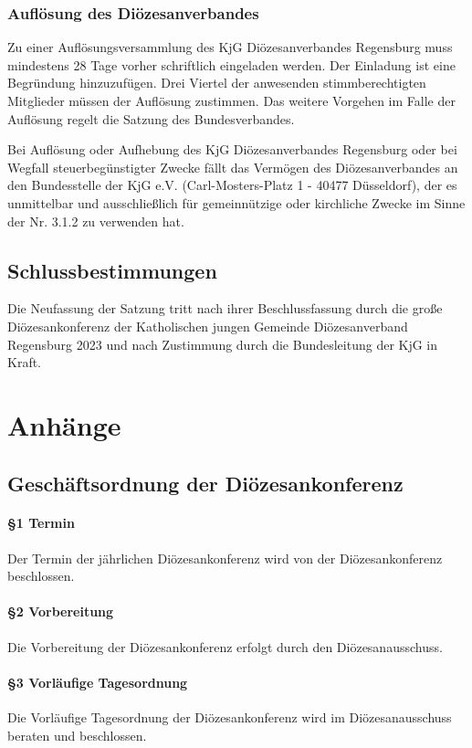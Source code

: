 \documentclass[12pt]{report}
\begin{document}
\begin{justify}
\section{Auflösung des Diözesanverbandes}
Zu einer Auflösungsversammlung des KjG Diözesanverbandes Regensburg muss mindestens 28 Tage vorher
schriftlich eingeladen werden. Der Einladung ist eine Begründung hinzuzufügen. Drei Viertel der
anwesenden stimmberechtigten Mitglieder müssen der Auflösung zustimmen. Das weitere Vorgehen
im Falle der Auflösung regelt die Satzung des Bundesverbandes.

Bei Auflösung oder Aufhebung des KjG Diözesanverbandes Regensburg oder bei Wegfall steuerbegünstigter Zwecke fällt das Vermögen des Diözesanverbandes an den Bundesstelle der KjG e.V. (Carl-Mosters-Platz 1 - 40477 Düsseldorf), der es unmittelbar und ausschließlich für gemeinnützige oder kirchliche Zwecke im Sinne der Nr. 3.1.2 zu verwenden hat.

\chapter{Schlussbestimmungen}
Die Neufassung der Satzung tritt nach ihrer Beschlussfassung durch die große
Diözesankonferenz der Katholischen jungen Gemeinde Diözesanverband Regensburg
2023 und nach Zustimmung durch die Bundesleitung der KjG in Kraft.




\part*{Anhänge}

\chapter*{Geschäftsordnung der Diözesankonferenz}

\subsection*{§1 Termin}
Der Termin der jährlichen Diözesankonferenz wird von der Diözesankonferenz beschlossen.
\subsection*{§2 Vorbereitung}
Die Vorbereitung der Diözesankonferenz erfolgt durch den Diözesanausschuss.
\subsection*{§3 Vorläufige Tagesordnung}
Die Vorläufige Tagesordnung der Diözesankonferenz wird im Diözesanausschuss beraten und beschlossen.

\end{justify}
\end{document}
